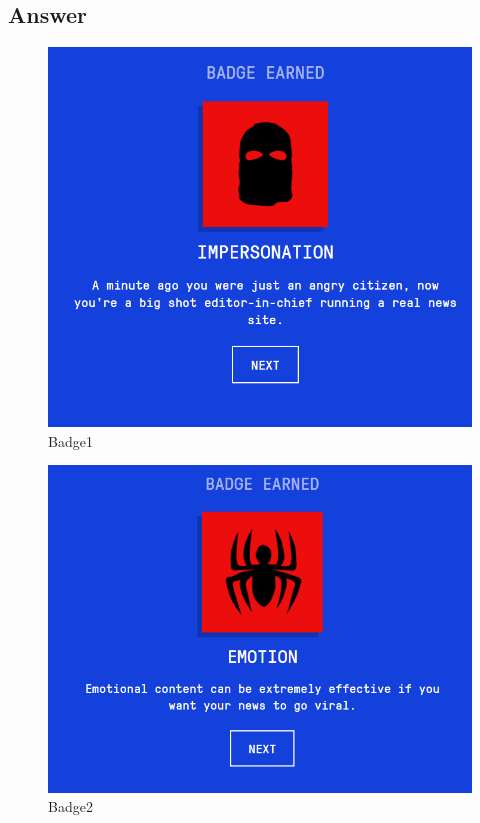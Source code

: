 \documentclass[12pt]{article}
\begin{document}
\subsection*{Answer}
\begin{figure}[h]
    \centering
    \includegraphics[trim=0 0 0 0, clip, width=\textwidth] {Capture1.PNG}
    \caption{Badge1}
    \label{fig1}
\end{figure}
\clearpage
\begin{figure}[h]
    \centering
    \includegraphics[trim=0 0 0 0, clip, width=\textwidth] {Capture2.PNG}
    \caption{Badge2}
    \label{fig2}
\end{figure}
\end{document}
